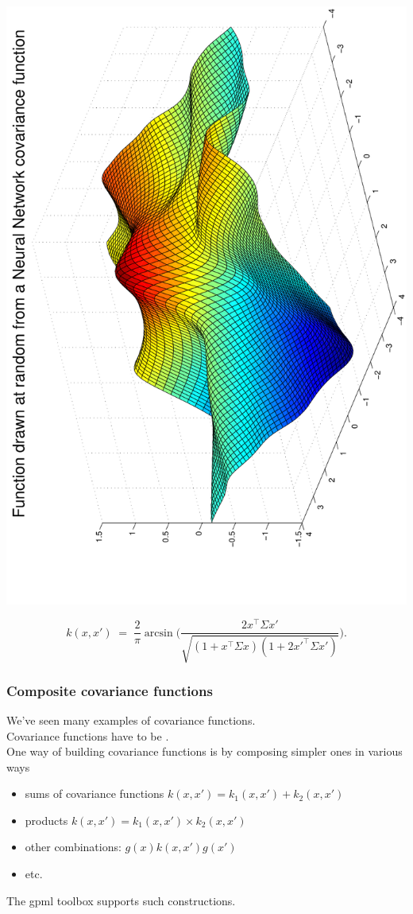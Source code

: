 \begin{frame}
\begin{center}
\includegraphics[height=0.85\textwidth,angle=-90]{gpprior2}
\end{center}
\[
k(x,x')\;=\;\frac{2}{\pi}\arcsin\big(\frac{2x^\top\Sigma x'}{\sqrt{(1+x^\top
\Sigma x)(1+2x'^\top\Sigma x')}}\big).
\]
\end{frame}


\begin{frame}
\frametitle{Composite covariance functions}

We've seen many examples of covariance functions.\\[1ex]

Covariance functions have to be .\\[1ex]

One way of building covariance functions is by composing simpler ones
in various ways
\begin{itemize}
\item sums of covariance functions $k(x,x') = k_1(x,x') + k_2(x,x')$
\item products $k(x,x') = k_1(x,x') \times k_2(x,x')$
\item other combinations: $g(x)k(x,x')g(x')$
\item etc.
\end{itemize}
The gpml toolbox supports such constructions.
\end{frame}
